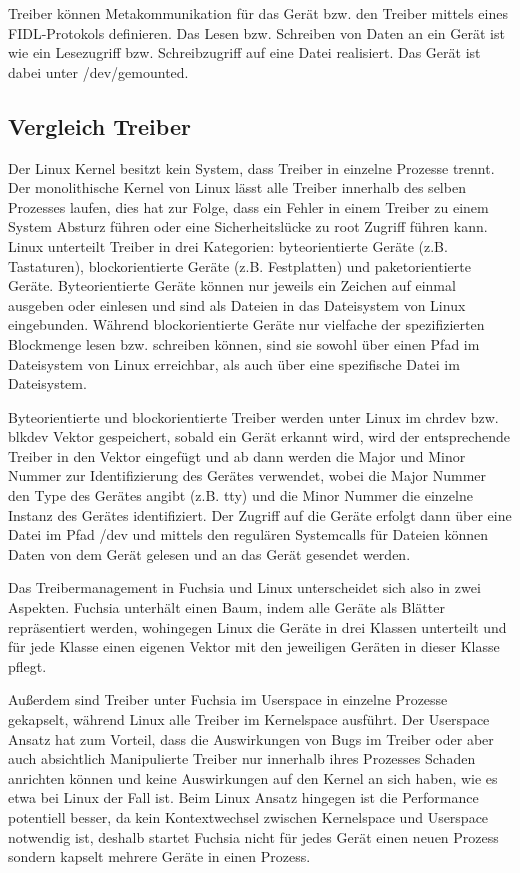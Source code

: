 \documentclass[a4paper]{scrartcl}
\begin{document}
Treiber können Metakommunikation für das Gerät bzw. den Treiber mittels eines FIDL-Protokols definieren. Das Lesen bzw. Schreiben von Daten an ein Gerät ist wie ein Lesezugriff bzw. Schreibzugriff auf eine Datei realisiert. Das Gerät ist dabei unter /dev/gemounted.
\subsection{Vergleich Treiber}
Der Linux Kernel besitzt kein System, dass Treiber in einzelne Prozesse trennt. Der monolithische Kernel von Linux lässt alle Treiber innerhalb des selben Prozesses laufen, dies hat zur Folge, dass ein Fehler in einem Treiber zu einem System Absturz führen oder eine Sicherheitslücke zu root Zugriff führen kann. Linux unterteilt Treiber in drei Kategorien: byteorientierte Geräte (z.B. Tastaturen), blockorientierte Geräte (z.B. Festplatten) und paketorientierte Geräte. Byteorientierte Geräte können nur jeweils ein Zeichen auf einmal ausgeben oder einlesen und sind als Dateien in das Dateisystem von Linux eingebunden. Während blockorientierte Geräte nur vielfache der spezifizierten Blockmenge lesen bzw. schreiben können, sind sie sowohl über einen Pfad im Dateisystem von Linux erreichbar, als auch über eine spezifische Datei im Dateisystem. 

Byteorientierte und blockorientierte Treiber werden unter Linux im chrdev bzw. blkdev Vektor gespeichert, sobald ein Gerät erkannt wird, wird der entsprechende Treiber in den Vektor eingefügt und ab dann werden die Major und Minor Nummer zur Identifizierung des Gerätes verwendet, wobei die Major Nummer den Type des Gerätes angibt (z.B. tty) und die Minor Nummer die einzelne Instanz des Gerätes identifiziert. Der Zugriff auf die Geräte erfolgt dann über eine Datei im Pfad /dev und mittels den regulären Systemcalls für Dateien können Daten von dem Gerät gelesen und an das Gerät gesendet werden.

Das Treibermanagement in Fuchsia und Linux unterscheidet sich also in zwei Aspekten. Fuchsia unterhält einen Baum, indem alle Geräte als Blätter repräsentiert werden, wohingegen Linux die Geräte in drei Klassen unterteilt und für jede Klasse einen eigenen Vektor mit den jeweiligen Geräten in dieser Klasse pflegt.

Außerdem sind Treiber unter Fuchsia im Userspace in einzelne Prozesse gekapselt, während Linux alle Treiber im Kernelspace ausführt. Der Userspace Ansatz hat zum Vorteil, dass die Auswirkungen von Bugs im Treiber oder aber auch absichtlich Manipulierte Treiber nur innerhalb ihres Prozesses Schaden anrichten können und keine Auswirkungen auf den Kernel an sich haben, wie es etwa bei Linux der Fall ist. Beim Linux Ansatz hingegen ist die Performance potentiell besser, da kein Kontextwechsel zwischen Kernelspace und Userspace notwendig ist, deshalb startet Fuchsia nicht für jedes Gerät einen neuen Prozess sondern kapselt mehrere Geräte in einen Prozess.
\end{document}
